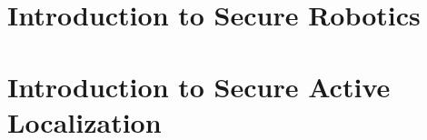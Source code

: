 
\section{Introduction to Secure Robotics}
\label{sec:sec-robo-intro}

\section{Introduction to Secure Active Localization}
\label{sec:sec-local-intro}
